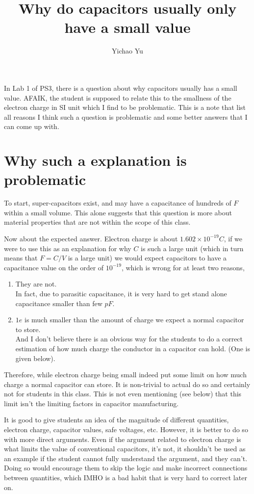 \documentclass[10pt,fleqn]{article}
\title{Why do capacitors usually only have a small value}
\author{Yichao Yu}
\begin{document}
\maketitle

In Lab 1 of PS3, there is a question about why capacitors usually has a small value.
AFAIK, the student is supposed to relate this to the smallness of the electron charge in
SI unit which I find to be problematic.
This is a note that list all reasons I think such a question is problematic and some
better answers that I can come up with.

\section{Why such a explanation is problematic}

To start, super-capacitors exist, and may have a capacitance of hundreds of $F$
within a small volume.
This alone suggests that this question is more about material properties that
are not within the scope of this class.

Now about the expected answer. Electron charge is about $1.602\times10^{-19}C$,
if we were to use this as an explanation for why $C$ is such a large unit
(which in turn means that $F = C / V$ is a large unit) we would expect capacitors to
have a capacitance value on the order of $10^{-19}$, which is wrong for at least two reasons,

\begin{enumerate}
\item They are not.\\
  In fact, due to parasitic capacitance, it is very hard to get stand alone capacitance smaller
  than few $pF$.
\item $1e$ is much smaller than the amount of charge we expect a normal capacitor to store.\\
  And I don't believe there is an obvious way for the students to do a correct estimation
  of how much charge the conductor in a capacitor can hold. (One is given below).
\end{enumerate}

Therefore, while electron charge being small indeed put some limit on how much charge a normal
capacitor can store.
It is non-trivial to actual do so and certainly not for students in this class.
This is not even mentioning (see below) that this limit isn't the limiting factors in
capacitor manufacturing.

It is good to give students an idea of the magnitude of different quantities, electron charge,
capacitor values, safe voltages, etc.
However, it is better to do so with more direct arguments. Even if the argument related to
electron charge is what limits the value of conventional capacitors, it's not,
it shouldn't be used as an example if the student cannot fully understand the argument,
and they can't.
Doing so would encourage them to skip the logic and make incorrect connections between
quantities, which IMHO is a bad habit that is very hard to correct later on.
\end{document}
